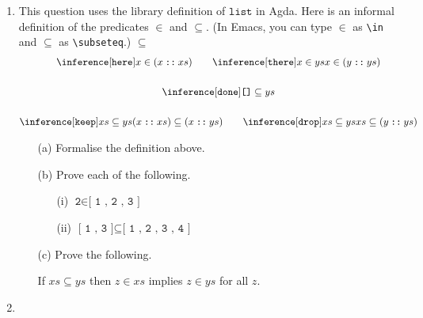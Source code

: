 \documentclass{examhons2018}
\begin{document}
\begin{enumerate}
 
\item \rubricqA

\newcommand{\key}{\texttt}
\newcommand{\List}{\key{list}}
\newcommand{\nil}{\texttt{[]}}
\newcommand{\cons}{\mathbin{\key{::}}}
\newcommand{\member}{\key{member}}
\newcommand{\sublist}{\key{sublist}}

This question uses the library definition of $\List$ in Agda.
Here is an informal definition of the predicates $\in$
and $\subseteq$.  (In Emacs, you can type $\in$ as \verb$\in$ and $\subseteq$ as \verb$\subseteq$.)
$\subseteq$
\begin{gather*}
\inference[$\key{here}$]
  {}
  {x \in (x \cons xs)}
\qquad
\inference[$\key{there}$]
  {x \in ys}
  {x \in (y \cons ys)}
\\~\\
\inference[$\key{done}$]
  {}
  {\nil \subseteq ys}
\\~\\
\inference[$\key{keep}$]
  {xs \subseteq ys}
  {(x \cons xs) \subseteq (x \cons ys)}
\qquad
\inference[$\key{drop}$]
  {xs \subseteq ys}
  {xs \subseteq (y \cons ys)}
\end{gather*}

\begin{itemize}

\item[(a)] Formalise the definition above.

\item[(b)] Prove each of the following.
  \begin{itemize}
  \item[(i)]  $\key{2} \in \key{[~1~,~2~,~3~]}$
  \item[(ii)]  $\key{[~1~,~3~]} \subseteq \key{[~1~,~2~,~3~,~4~]}$
  \end{itemize}

\item[(c)] Prove the following.
\begin{center}
If $xs \subseteq ys$ then $z \in xs$ implies $z \in ys$ for all $z$.
\end{center}    

\end{itemize}

\newpage

\item \rubricqB

\newcommand{\Tree}{\texttt{Tree}}
\newcommand{\leaf}{\texttt{leaf}}
\newcommand{\branch}{\texttt{branch}}
\newcommand{\CASET}{\texttt{caseT}}
\newcommand{\caseT}[6]{\texttt{case}~#1~\texttt{[leaf}~#2~\Rightarrow~#3~\texttt{|}~#4~\texttt{branch}~#5~\Rightarrow~#6\texttt{]}}
\newcommand{\ubar}{\texttt{\underline{~}}}
\newcommand{\comma}{\,\texttt{,}\,}
\newcommand{\V}{\texttt{V}}
\newcommand{\dash}{\texttt{-}}
\newcommand{\Value}{\texttt{Value}}
\newcommand{\becomes}{\longrightarrow}
\newcommand{\subst}[3]{#1~\texttt{[}~#2~\texttt{:=}~#3~\texttt{]}}



\end{enumerate}
\end{document}
